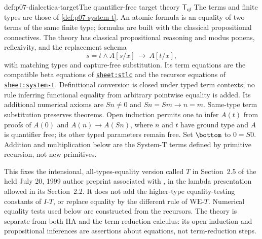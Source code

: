 \begin{hbdefinition}{def:p07-dialectica-target}{The quantifier-free target theory \(\mathsf T_{\mathrm{qf}}\)}
The terms and finite types are those of \cref{def:p07-system-t}.
An atomic formula is an equality of two terms of the same finite type;
formulas are built with the classical propositional connectives.
The theory has classical propositional reasoning and modus ponens,
reflexivity, and the replacement schema
\[
 s=t\land A[s/x]\ \longrightarrow\ A[t/x],
\]
with matching types and capture-free substitution. Its term equations
are the compatible beta equations of
\hyperref[sheet:stlc]{\texttt{sheet:stlc}} and the recursor equations of
\hyperref[sheet:system-t]{\texttt{sheet:system-t}}. Definitional conversion is closed under typed term contexts; no rule
inferring functional equality from arbitrary pointwise equality is added.
Its additional numerical axioms are
\(Sn\ne0\) and \(Sn=Sm\to n=m\).
Same-type term substitution preserves theorems. Open induction permits
one to infer \(A(t)\) from proofs of \(A(0)\) and
\(A(n)\to A(Sn)\), where \(n\) and \(t\) have ground type and
\(A\) is quantifier free; its other typed parameters remain free.
Set \(\bottom\) to \(0=S0\). Addition and multiplication below are
the System-T terms defined by primitive recursion, not new primitives.

This fixes the intensional, all-types-equality version called \(T\)
in Section~2.5 of the held July 20, 1999 author preprint associated with
\cite{AvigadFeferman1998}, in the lambda presentation allowed in its
Section~2.2. It does not add the higher-type equality-testing constants
of \(I\text{-}T\), or replace equality by the different rule of
\(\mathrm{WE}\text{-}T\). Numerical equality tests used below are
constructed from the recursors. The theory is separate from both HA
and the term-reduction calculus: its open induction and propositional
inferences are assertions about equations, not term-reduction steps.
\end{hbdefinition}

